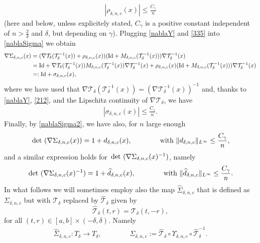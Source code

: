 \documentclass[a4paper,11pt]{article}
\numberwithin{equation}{section}
\def\det{\,{\rm det\ }}
\begin{document}
\begin{align}\label{212}
	\left|\rho_{\delta,n,c}(x)\right|\leq \frac{C_\gamma}{n}
\end{align}
(here and below, unless explicitely stated,  $C_\gamma$ is a positive constant independent of $n>\frac2\delta$ and $\delta$, but depending on $\gamma$).
Plugging \eqref{nablaY} and \eqref{335} into \eqref{nablaSigma} we obtain
\begin{align}\label{nablaSigma2}
\nabla \Sigma_{\delta,n,c}(x)&=(\nabla\mathcal T_\delta(\mathcal T_\delta^{-1}(x))+\rho_{\delta,n,c}(x))(\text{{\rm Id}}+M_{\delta,n,c}(\mathcal T_\delta^{-1}(x)))\nabla\mathcal T_\delta^{-1}(x)\nonumber\\
&=\text{{\rm Id}}+\nabla\mathcal T_\delta(\mathcal T_\delta^{-1}(x))M_{\delta,n,c}(\mathcal T_\delta^{-1}(x))\nabla\mathcal T_\delta^{-1}(x)+\rho_{\delta,n,c}(x)(\text{{\rm Id}}+M_{\delta,n,c}(\mathcal T_\delta^{-1}(x)))\nabla\mathcal T_\delta^{-1}(x)\nonumber\\
&=:\text{{\rm Id}}+\sigma_{\delta,n,c}(x),
\end{align}
where we have used that $\nabla\mathcal T_\delta(\mathcal T_\delta^{-1}(x))=(\nabla\mathcal T_\delta^{-1}(x))^{-1}$ and, thanks to \eqref{nablaY}, \eqref{212}, and the Lipschitz continuity of $\nabla \mathcal T_\delta$, we have
\begin{align}\label{gradSigma}
	|\sigma_{\delta,n,c}(x)|\leq \frac{C_\gamma}{n}.
\end{align}
Finally, by \eqref{nablaSigma2}, we have also, for $n$ large enough
\begin{align}\label{detSigma}
\det(\nabla \Sigma_{\delta,n,c}(x))=1+d_{\delta,n,c}(x),\qquad \qquad \text{with }\|d_{\delta,n,c}\|_{L^\infty}\leq \frac{C_\gamma}{n},
\end{align}
and a similar expression holds for $\det(\nabla \Sigma_{\delta,n,c}(x)^{-1})$, namely
\begin{align}\label{detSigmainverse}
	\det(\nabla \Sigma_{\delta,n,c}(x)^{-1})=1+\widehat d_{\delta,n,c}(x),\qquad \qquad \text{with }\|\widehat d_{\delta,n,c}\|_{L^\infty}\leq \frac{C_\gamma}{n}.
\end{align}
In what follows we will sometimes employ also the map $\widehat \Sigma_{\delta,n,c}$ that is defined as $\Sigma_{\delta,n,c}$ but with $\mathcal T_\delta$ replaced by $\widehat {\mathcal T}_\delta$ given by
$$\widehat {\mathcal T}_\delta(t,r)={\mathcal T}_\delta(t,-r),$$
for all $(t,r)\in [a,b]\times (-\delta,\delta).$
Namely
\begin{align}
	\widehat \Sigma_{\delta,n,c}:T_\delta\rightarrow T_\delta,\qquad \qquad \Sigma_{\delta,n,c}:=\widehat {\mathcal T}_\delta \circ \Upsilon_{\delta,n,c}\circ \widehat{\mathcal T}_\delta^{-1}.
\end{align}
\end{document}
